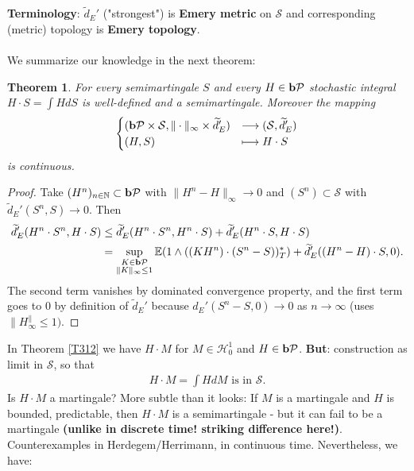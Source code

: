 \documentclass[12pt,a4paper, twoside]{article}
\newtheorem{thm}{Theorem}[section]
\theoremstyle{definition}
\newcommand{\EE}{\mathbb{E}} %
\newcommand{\pred}{\textbf{\text{b}}\mathcal{P}}
\begin{document}
\\
\\
\textbf{Terminology}: $\widetilde{d}_E'$ ("strongest") is \textbf{Emery metric} on $\mathcal{S}$ and corresponding (metric) topology is \textbf{Emery topology}.
\\\\
We summarize our knowledge in the next theorem:
\begin{thm}\label{T313} For every semimartingale $S$ and every $H \in \pred$ stochastic integral $H \cdot S= \int H dS$ is well-defined and a semimartingale. Moreover  the mapping 
\begin{align*}
\begin{cases} ( \pred \times \mathcal{S}, \| \cdot \|_\infty \times \widetilde{d}_E') & \longrightarrow ( \mathcal{S}, \widetilde{d}_E') \\
(H, S) & \longmapsto H \cdot S
 \end{cases}
\end{align*}
is continuous. 
\end{thm}
\begin{proof}
Take $(H^n)_{n \in \mathbb{N}} \subset \pred$ with $\|H^n-H\|_\infty \to 0$ and $(S^n) \subset \mathcal{S}$ with $\widetilde{d}_E'(S^n,S) \to 0$. Then  
\begin{align*}
\widetilde{d}_E'(H^n \cdot S^n, H \cdot S) &\leq \widetilde{d}_E'(H^n \cdot S^n , H^n \cdot S) + \widetilde{d}_E'(H^n \cdot S, H \cdot S) \\
& = \sup_{ \substack{ K \in \pred \\ \|K\|_\infty \leq 1}} \EE(1 \wedge ((KH^n) \cdot (S^n-S))_T^*) + \widetilde{d}_E'((H^n-H) \cdot S, 0).
\end{align*}
The second term vanishes by dominated convergence property, and the first term goes to $0$ by definition of $\widetilde{d}_E'$ because $d_E'(S^n-S, 0) \to 0$ as $n \to \infty$ (uses $\|H^\|_\infty \leq 1)$. 
\end{proof}
\newpage
In Theorem \ref{T312} we have $H \cdot M$ for $M \in \mathcal{H}_0^1$ and $H \in \pred$. \textbf{But}: construction as limit in $\mathcal{S}$, so that  
\begin{align*}
H \cdot M = \int H dM \text{ is in } \mathcal{S}.
\end{align*}
Is $H \cdot M$ a martingale? More subtle than it looks: If $M$ is a martingale and $H$ is bounded, predictable, then $H \cdot M$ is a semimartingale - but it can fail to be a martingale \textbf{(unlike in discrete time! striking difference here!)}. Counterexamples in Herdegem/Herrimann, in continuous time. Nevertheless, we have:
\end{document}
